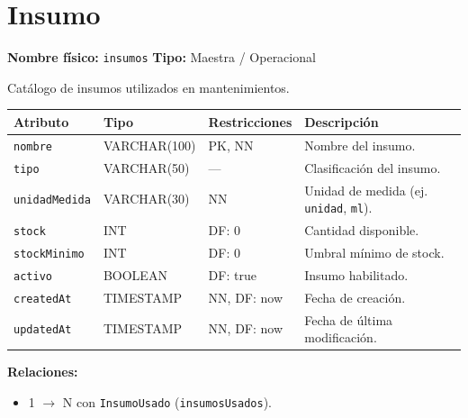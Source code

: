 \documentclass[12pt,a4paper]{article}
\newenvironment{tabladesc}[3]{%
  \section{#1}
  \textbf{Nombre físico:} \texttt{#2} \hfill \textbf{Tipo:} #3\par
  \medskip
}{%
  \bigskip
}
\begin{document}
\begin{tabladesc}{Insumo}{insumos}{Maestra / Operacional}

Catálogo de insumos utilizados en mantenimientos.

\bigskip
\begin{longtable}{L{3.5cm} L{2.5cm} L{2cm} L{7.5cm}}
\toprule
\textbf{Atributo} & \textbf{Tipo} & \textbf{Restricciones} & \textbf{Descripción} \\
\midrule
\endhead
\bottomrule
\endfoot
\texttt{nombre}     & VARCHAR(100) & PK, NN & Nombre del insumo. \\
\texttt{tipo}       & VARCHAR(50)  & ---    & Clasificación del insumo. \\
\texttt{unidadMedida}& VARCHAR(30) & NN     & Unidad de medida (ej. \texttt{unidad}, \texttt{ml}). \\
\texttt{stock}      & INT          & DF: 0  & Cantidad disponible. \\
\texttt{stockMinimo}& INT          & DF: 0  & Umbral mínimo de stock. \\
\texttt{activo}     & BOOLEAN      & DF: true & Insumo habilitado. \\
\texttt{createdAt}  & TIMESTAMP    & NN, DF: now & Fecha de creación. \\
\texttt{updatedAt}  & TIMESTAMP    & NN, DF: now & Fecha de última modificación. \\
\bottomrule
\end{longtable}

\textbf{Relaciones:}
\begin{itemize}[nosep]
  \item 1 $\rightarrow$ N con \texttt{InsumoUsado} (\texttt{insumosUsados}).
\end{itemize}
\end{tabladesc}
\end{document}
